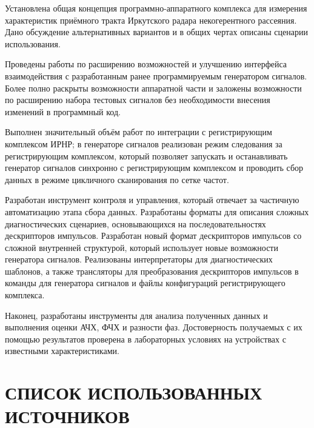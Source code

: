 \documentclass{report}
\begin{document}
Установлена общая концепция программно-аппаратного комплекса для измерения характеристик приёмного тракта Иркутского радара некогерентного рассеяния. Дано обсуждение альтернативных вариантов и в общих чертах описаны сценарии использования.

Проведены работы по расширению возможностей и улучшению интерфейса взаимодействия с разработанным ранее программируемым генератором сигналов. Более полно раскрыты возможности аппаратной части и заложены возможности по расширению набора тестовых сигналов без необходимости внесения изменений в программный код.

Выполнен значительный объём работ по интеграции с регистрирующим комплексом ИРНР; в генераторе сигналов реализован режим следования за регистрирующим комплексом, который позволяет запускать и останавливать генератор сигналов синхронно с регистрирующим комплексом и проводить сбор данных в режиме цикличного сканирования по сетке частот.

Разработан инструмент контроля и управления, который отвечает за частичную автоматизацию этапа сбора данных. Разработаны форматы для описания сложных диагностических сценариев, основывающихся на последовательностях дескрипторов импульсов. Разработан новый формат дескрипторов импульсов со сложной внутренней структурой, который использует новые возможности генератора сигналов. Реализованы интерпретаторы для диагностических шаблонов, а также трансляторы для преобразования дескрипторов импульсов в команды для генератора сигналов и файлы конфигураций регистрирующего комплекса.

Наконец, разработаны инструменты для анализа полученных данных и выполнения оценки АЧХ, ФЧХ и разности фаз. Достоверность получаемых с их помощью результатов проверена в лабораторных условиях на устройствах с известными характеристиками.

\chapter*{СПИСОК ИСПОЛЬЗОВАННЫХ ИСТОЧНИКОВ}
\end{document}
